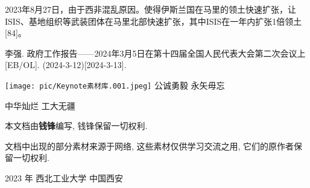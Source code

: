 \documentclass[10pt, UTF8]{ctexbook} %
\begin{document}
2023年8月27日，由于西非混乱原因。使得伊斯兰国在马里的领土快速扩张，让ISIS、基地组织等武装团体在马里北部快速扩张，其中ISIS在一年内扩张1倍领土[84]。



\newpage
\thispagestyle{empty}
\begin{thebibliography}{1}
    李强. 政府工作报告——2024年3月5日在第十四届全国人民代表大会第二次会议上 [EB/OL].
    (2024-3-12)[2024-3-13].
\end{thebibliography}

\pagestyle{empty}
\newpage

\vspace*{1.3cm}
\begin{center}
    \texttt{[image: pic/Keynote素材库.001.jpeg]}
    \large
    公诚勇毅 \quad 永矢毋忘

    中华灿烂 \quad 工大无疆
\end{center}
\vspace*{5cm}
\begin{center}
    \footnotesize
    本文档由\textbf{钱锋}编写, 钱锋保留一切权利.

    文档中出现的部分素材来源于网络, 这些素材仅供学习交流之用, 
    它们的原作者保留一切权利.

    2023 年 \quad 西北工业大学 \quad 中国西安 
\end{center}
\end{document}

